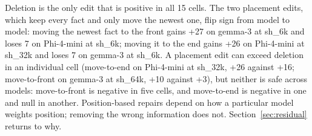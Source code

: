 \documentclass[journal=jcisd8,manuscript=article]{achemso}
\begin{document}
\begin{table}[H]\centering\small
\caption{Overall accuracy (of 100) under the three edits; identical groups in every row of a subset. Bold marks the H-Nav-GEO arm, not the row maximum.}\label{tab:placement}
\end{table}


Deletion is the only edit that is positive in all 15 cells. The two placement edits, which keep every fact and only move the newest one, flip sign from model to model: moving the newest fact to the front gains +27 on gemma-3 at sh\_6k and loses 7 on Phi-4-mini at sh\_6k; moving it to the end gains +26 on Phi-4-mini at sh\_32k and loses 7 on gemma-3 at sh\_6k. A placement edit can exceed deletion in an individual cell (move-to-end on Phi-4-mini at sh\_32k, +26 against +16; move-to-front on gemma-3 at sh\_64k, +10 against +3), but neither is safe across models: move-to-front is negative in five cells, and move-to-end is negative in one and null in another. Position-based repairs depend on how a particular model weights position; removing the wrong information does not. Section~\ref{sec:residual} returns to why.
\end{document}
